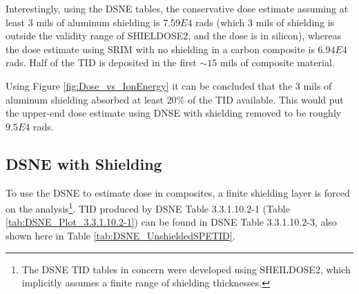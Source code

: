 \documentclass{hitec}
\begin{document}
Interestingly, using the DSNE tables, the conservative dose estimate assuming at least 3 mils of aluminum shielding is $7.59E4$ rads (which $3$ mils of shielding is outside the validity range of SHIELDOSE2, and the dose is in silicon), whereas the dose estimate using SRIM with no shielding in a carbon composite is $6.94E4$ rads. Half of the TID is deposited in the first $\sim15$ mils of composite material.

Using Figure \ref{fig:Dose_vs_IonEnergy} it can be concluded that the $3$ mils of aluminum shielding absorbed at least $20\%$ of the TID available. This would put the upper-end dose estimate using DNSE with shielding removed to be roughly $9.5E4$ rads.

\subsection{DSNE with Shielding}\label{ssec:DSNEwithShielding}

To use the DSNE to estimate dose in composites, a finite shielding layer is forced on the analysis\footnote{The DSNE TID tables in concern were developed using SHEILDOSE2, which implicitly assumes a finite range of shielding thicknesses.}. TID produced by DSNE Table 3.3.1.10.2-1 (Table \ref{tab:DSNE_Plot_3.3.1.10.2-1}) can be found in DSNE Table 3.3.1.10.2-3, also shown here in Table \ref{tab:DSNE_UnshieldedSPETID}.

\end{document}
